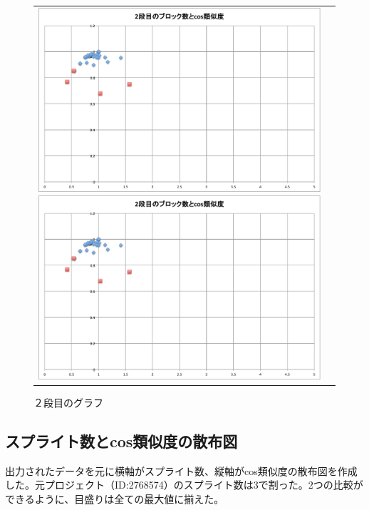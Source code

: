 \documentclass[a4paper,10pt,onecolumn,oneside,openany]{jsbook}
\begin{document}
\begin{figure}[h]
\begin{tabular}{cc}
\begin{minipage}[t]{0.45\hsize}
	 \centering
	 \includegraphics[keepaspectratio, scale = 0.26]{mazegame_second_block.pdf}
	 \includegraphics[keepaspectratio, scale = 0.25]{mazegame_second_block.pdf}
	 \caption{２段目のグラフ}
	 \label{mazegame_second_block_cos}
	\end{minipage}
 \end{tabular}
 \end{figure}

\subsection{スプライト数とcos類似度の散布図}
 出力されたデータを元に横軸がスプライト数、縦軸がcos類似度の散布図を作成した。元プロジェクト（ID:2768574）のスプライト数は3で割った。2つの比較ができるように、目盛りは全ての最大値に揃えた。
\end{document}
